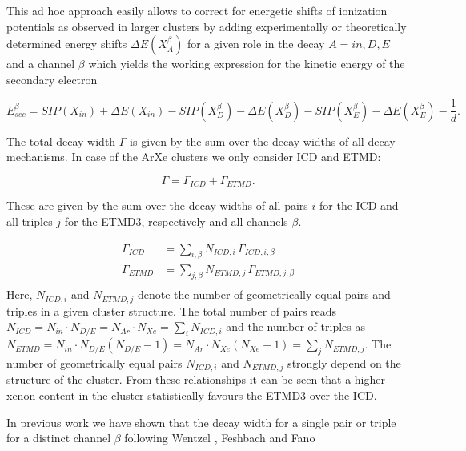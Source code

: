 This ad hoc approach easily allows to correct for energetic shifts of         
ionization potentials as observed in larger clusters by adding experimentally
or theoretically determined energy shifts $\Delta E(X_{A}^{\beta})$
for a given role in the decay
$A=in,D,E$ and a channel $\beta$ which yields
the working expression for the kinetic energy of the secondary electron

\begin{equation}
 E_{sec}^\beta = SIP(X_{in}) + \Delta E (X_{in})
               - SIP(X_{D}^\beta) - \Delta E (X_{D}^\beta)
               - SIP(X_{E}^\beta) - \Delta E (X_{E}^\beta)
               - \frac 1d .
\end{equation}

The total decay width $\Gamma$ is given by the sum over the decay widths
of all decay mechanisms. In case of the ArXe clusters we only consider
ICD and ETMD:

\begin{equation}
 \Gamma = \Gamma_{ICD} + \Gamma_{ETMD} .
\end{equation}

These are given by the sum over the decay widths of all pairs $i$ for the
ICD and all triples $j$ for the ETMD3, respectively and all channels $\beta$.

\begin{align}
 \Gamma_{ICD}  &= \sum\limits_{i,\beta} N_{ICD,i}  \, \Gamma_{ICD,i,\beta}\\
 \Gamma_{ETMD} &= \sum\limits_{j,\beta} N_{ETMD,j} \, \Gamma_{ETMD,j,\beta}\\
\end{align}
Here, $N_{ICD,i}$ and $N_{ETMD,j}$ denote the number of geometrically
equal pairs and triples in a given cluster structure. The total number of pairs
reads
$N_{ICD} = N_{in} \cdot N_{D/E} = N_{Ar} \cdot N_{Xe}
 = \sum\limits_i N_{ICD,i}$ and the number of triples as
$N_{ETMD} = N_{in} \cdot N_{D/E} (N_{D/E} - 1) = N_{Ar} \cdot N_{Xe} (N_{Xe} - 1)
 = \sum\limits_j N_{ETMD,j}$.
The number of geometrically equal pairs $N_{ICD,i}$ and $N_{ETMD,j}$
strongly depend on the structure of the cluster. From these relationships
it can be seen that a higher xenon content in the cluster statistically
favours the ETMD3 over the ICD.

In previous work \cite{Fasshauer13,Fasshauer_thesis} we have shown that
the decay width for a single pair or triple for a distinct channel $\beta$
following Wentzel \cite{Wentzel27}, Feshbach\cite{Feshbach58,Feshbach62}
and Fano \cite{Fano61}


